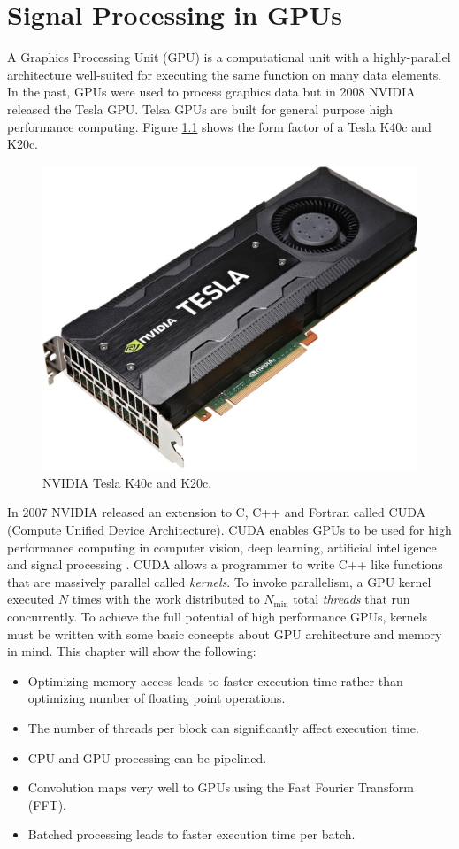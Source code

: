 \chapter{Signal Processing in GPUs}
\label{chap:gpu}
A Graphics Processing Unit (GPU) is a computational unit with a highly-parallel architecture well-suited for executing the same function on many data elements.
In the past, GPUs were used to process graphics data but in 2008 NVIDIA released the Tesla GPU.
Telsa GPUs are built for general purpose high performance computing.
Figure \ref{fig:GPUpicture} shows the form factor of a Tesla K40c and K20c.
\begin{figure}
	\centering\includegraphics[width=5in]{figures/gpu_intro/k40c_k20c.jpg}
	\caption{NVIDIA Tesla K40c and K20c.}
	\label{fig:GPUpicture}
\end{figure}

In 2007 NVIDIA released an extension to C, C++ and Fortran called CUDA (Compute Unified Device Architecture).
CUDA enables GPUs to be used for high performance computing in computer vision, deep learning, artificial intelligence and signal processing \cite{wikipedia-gpu:2015}.
CUDA allows a programmer to write C++ like functions that are massively parallel called \textit{kernels}.
To invoke parallelism, a GPU kernel executed $N$ times with the work distributed to $N_\text{min}$ total \textit{threads} that run concurrently.
To achieve the full potential of high performance GPUs, kernels must be written with some basic concepts about GPU architecture and memory in mind.
This chapter will show the following:
\begin{itemize}
\item Optimizing memory access leads to faster execution time rather than optimizing number of floating point operations.
\item The number of threads per block can significantly affect execution time.
\item CPU and GPU processing can be pipelined.
\item Convolution maps very well to GPUs using the Fast Fourier Transform (FFT).
\item Batched processing leads to faster execution time per batch.
\end{itemize}

